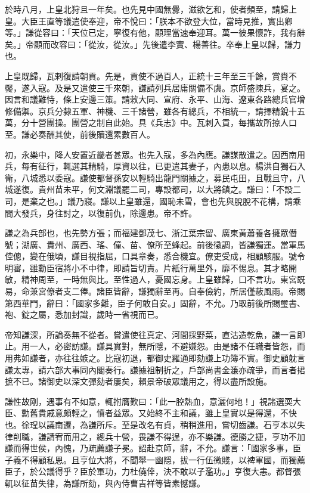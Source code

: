 \begin{pinyinscope}
於時八月，上皇北狩且一年矣。也先見中國無釁，滋欲乞和，使者頻至，請歸上皇。大臣王直等議遣使奉迎，帝不悅曰：「朕本不欲登大位，當時見推，實出卿等。」謙從容曰：「天位已定，寧復有他，顧理當速奉迎耳。萬一彼果懷詐，我有辭矣。」帝顧而改容曰：「從汝，從汝。」先後遣李實、楊善往。卒奉上皇以歸，謙力也。

上皇既歸，瓦剌復請朝貢。先是，貢使不過百人，正統十三年至三千餘，賞賚不饜，遂入寇。及是又遣使三千來朝，謙請列兵居庸關備不虞。京師盛陳兵，宴之。因言和議難恃，條上安邊三策。請敕大同、宣府、永平、山海、遼東各路總兵官增修備禦。京兵分隸五軍、神機、三千諸營，雖各有總兵，不相統一，請擇精銳十五萬，分十營團操。團營之制自此始。具《兵志》中。瓦剌入貢，每攜故所掠人口至。謙必奏酬其使，前後贖還累數百人。

初，永樂中，降人安置近畿者甚眾。也先入寇，多為內應。謙謀散遣之。因西南用兵，每有征行，輒選其精騎，厚資以往，已更遣其妻子，內患以息。楊洪自獨石入衛，八城悉以委寇。謙使都督孫安以輕騎出龍門關據之，募民屯田，且戰且守，八城遂復。貴州苗未平，何文淵議罷二司，專設都司，以大將鎮之。謙曰：「不設二司，是棄之也。」議乃寢。謙以上皇雖還，國恥未雪，會也先與脫脫不花構，請乘間大發兵，身往討之，以復前仇，除邊患。帝不許。

謙之為兵部也，也先勢方張；而福建鄧茂七、浙江葉宗留、廣東黃蕭養各擁眾僭號；湖廣、貴州、廣西、瑤、僮、苗、僚所至蜂起。前後徵調，皆謙獨運。當軍馬倥傯，變在俄頃，謙目視指屈，口具章奏，悉合機宜。僚吏受成，相顧駭服。號令明審，雖勳臣宿將小不中律，即請旨切責。片紙行萬里外，靡不惕息。其才略開敏，精神周至，一時無與比。至性過人，憂國忘身。上皇雖歸，口不言功。東宮既易，命兼宮僚者支二俸。諸臣皆辭，謙獨辭至再。自奉儉約，所居僅蔽風雨。帝賜第西華門，辭曰：「國家多難，臣子何敢自安。」固辭，不允。乃取前後所賜璽書、袍、錠之屬，悉加封識，歲時一省視而已。

帝知謙深，所論奏無不從者。嘗遣使往真定、河間採野菜，直沽造乾魚，謙一言即止。用一人，必密訪謙。謙具實對，無所隱，不避嫌怨。由是諸不任職者皆怨，而用弗如謙者，亦往往嫉之。比寇初退，都御史羅通即劾謙上功簿不實。御史顧躭言謙太專，請六部大事同內閣奏行。謙據祖制折之，戶部尚書金濂亦疏爭，而言者捃摭不已。諸御史以深文彈劾者屢矣，賴景帝破眾議用之，得以盡所設施。

謙性故剛，遇事有不如意，輒拊膺歎曰：「此一腔熱血，意灑何地！」視諸選耎大臣、勳舊貴戚意頗輕之，憤者益眾。又始終不主和議，雖上皇實以是得還，不快也。徐珵以議南遷，為謙所斥。至是改名有貞，稍稍進用，嘗切齒謙。石亨本以失律削職，謙請宥而用之，總兵十營，畏謙不得逞，亦不樂謙。德勝之捷，亨功不加謙而得世侯，內愧，乃疏薦謙子冕。詔赴京師，辭，不允。謙言：「國家多事，臣子義不得顧私恩。且亨位大將，不聞舉一幽隱，拔一行伍微賤，以裨軍國，而獨薦臣子，於公議得乎？臣於軍功，力杜僥倖，決不敢以子濫功。」亨復大恚。都督張軏以征苗失律，為謙所劾，與內侍曹吉祥等皆素憾謙。


\end{pinyinscope}
